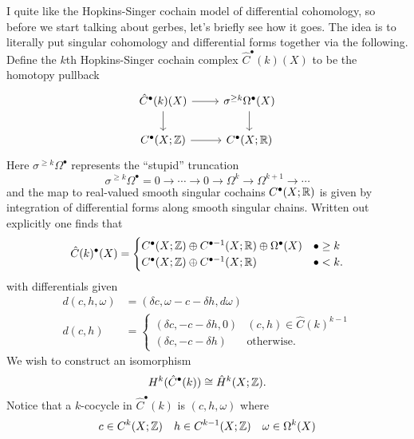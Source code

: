 \documentclass{amsart}
\begin{document}
I quite like the Hopkins-Singer cochain model of differential cohomology, so
before we start talking about gerbes, let's briefly see how it goes.
The idea is to literally put singular cohomology and differential forms
together via the following. Define the $k$th Hopkins-Singer cochain complex
$\hat C^\bullet(k)(X)$ to be the homotopy pullback
\begin{equation*}
    \begin{tikzcd}
        \hat C^\bullet(k)(X) \rar\dar & \sigma^{\geq k}\Omega^\bullet(X)\dar \\
        C^\bullet(X;\Z) \rar & C^\bullet(X;\R)
    \end{tikzcd}
\end{equation*}
Here $\sigma^{\geq k}\Omega^\bullet$ represents the ``stupid'' truncation
\begin{equation*}
    \sigma^{\geq k}\Omega^\bullet = 0\to\cdots\to0\to\Omega^k \to \Omega^{k+1}\to\cdots
\end{equation*}
and the map to real-valued smooth singular cochains $C^\bullet(X;\mathbb{R})$ is given
by integration of differential forms along smooth singular chains. Written out
explicitly one finds that
\begin{equation*}
    \hat C(k)^\bullet(X) =
    \begin{cases}
        C^\bullet(X;\mathbb{Z}) \oplus C^{\bullet-1}(X;\mathbb{R}) \oplus \Omega^\bullet(X) & \bullet \geq k \\
        C^\bullet(X;\mathbb{Z}) \oplus C^{\bullet-1}(X;\mathbb{R}) & \bullet < k.
    \end{cases}
\end{equation*}
with differentials given
\begin{align*}
        d(c,h,\omega) &= (\delta c,\omega-c-\delta h, d\omega) \\
        d(c,h) &=
        \begin{cases}
            (\delta c,-c-\delta h,0) & (c,h)\in\hat C(k)^{k-1} \\
            (\delta c, -c-\delta h) & \text{otherwise}.
        \end{cases}
\end{align*}
We wish to construct an isomorphism
\begin{equation*}
    H^k(\hat C^\bullet(k)) \cong \hat H^k(X;\mathbb{Z}).
\end{equation*}
Notice that a $k$-cocycle in $\hat C^\bullet(k)$ is $(c,h,\omega)$ where
\begin{equation*}
    c\in C^k(X;\mathbb{Z}) \quad h\in C^{k-1}(X;\mathbb{Z}) \quad \omega\in\Omega^k(X)
\end{equation*}
\end{document}
